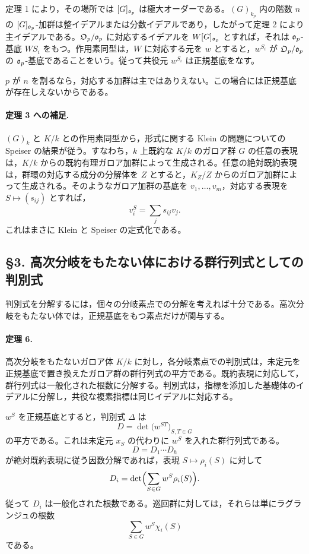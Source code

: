 定理 1 により，その場所では \([G]_{\mathfrak o_p}\) は極大オーダーである。\((G)_{k_p}\) 内の階数 \(n\) の \([G]_{\mathfrak o_p}\)-加群は整イデアルまたは分数イデアルであり，したがって定理 2 により主イデアルである。\(\mathfrak O_p/\mathfrak o_p\) に対応するイデアルを \(W[G]_{\mathfrak o_p}\) とすれば，それは \(\mathfrak o_p\)-基底 \(WS_i\) をもつ。作用素同型は，\(W\) に対応する元を \(w\) とすると，\(w^{S_i}\) が \(\mathfrak O_p/\mathfrak o_p\) の \(\mathfrak o_p\)-基底であることをいう。従って共役元 \(w^{S_i}\) は正規基底をなす。

\(p\) が \(n\) を割るなら，対応する加群は主ではありえない。この場合には正規基底が存在しえないからである。

\paragraph{定理 3 への補足.}
\((G)_k\) と \(K/k\) との作用素同型から，形式に関する Klein の問題についての Speiser の結果が従う。すなわち，\(k\) 上既約な \(K/k\) のガロア群 \(G\) の任意の表現は，\(K/k\) からの既約有理ガロア加群によって生成される。任意の絶対既約表現は，群環の対応する成分の分解体を \(Z\) とすると，\(K_Z/Z\) からのガロア加群によって生成される。そのようなガロア加群の基底を \(v_1,\ldots,v_m\)，対応する表現を \(S\mapsto (s_{ij})\) とすれば，
\[
        v_i^S=\sum_j s_{ij}v_j.
\]
これはまさに Klein と Speiser の定式化である。

\subsection*{§3. 高次分岐をもたない体における群行列式としての判別式}

判別式を分解するには，個々の分岐素点での分解を考えれば十分である。高次分岐をもたない体では，正規基底をもつ素点だけが関与する。

\paragraph{定理 6.}
高次分岐をもたないガロア体 \(K/k\) に対し，各分岐素点での判別式は，未定元を正規基底で置き換えたガロア群の群行列式の平方である。既約表現に対応して，群行列式は一般化された根数に分解する。判別式は，指標を添加した基礎体のイデアルに分解し，共役な複素指標は同じイデアルに対応する。

\(w^S\) を正規基底とすると，判別式 \(\Delta\) は
\[
        D=\det\bigl(w^{ST}\bigr)_{S,T\in G}
\]
の平方である。これは未定元 \(x_S\) の代わりに \(w^S\) を入れた群行列式である。
\[
        D=D_1\cdots D_h
\]
が絶対既約表現に従う因数分解であれば，表現 \(S\mapsto \rho_i(S)\) に対して
\[
        D_i=\det\Bigl(\sum_{S\in G} w^S\rho_i(S)\Bigr).
\]
従って \(D_i\) は一般化された根数である。巡回群に対しては，それらは単にラグランジュの根数
\[
        \sum_{S\in G} w^S\chi_i(S)
\]
である。

